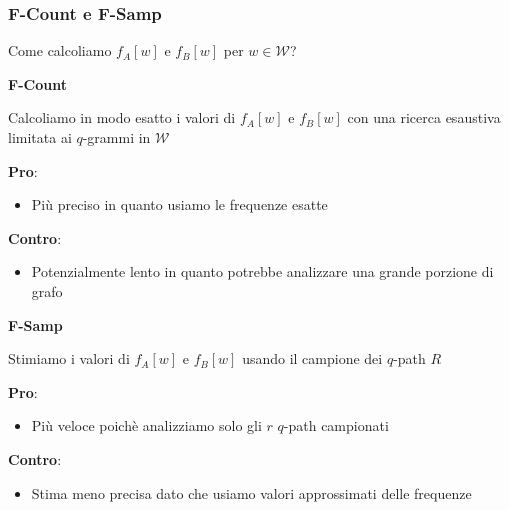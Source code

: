 \begin{frame}
	\frametitle{F-Count e F-Samp}
	\centering
	
	Come calcoliamo $f_A[w]$ e $f_B[w]$ per $w \in \mathcal{W}$?\medskip
	
	\pause
	
	\begin{minipage}{.45\textwidth}
		\centering
		\textbf{F-Count}
		
		Calcoliamo in modo esatto i valori di $f_A[w]$ e $f_B[w]$
		con una ricerca esaustiva limitata ai $q$-grammi in $\mathcal{W}$
		
		\bigskip
		
		\small		
		\textbf{Pro}:
		\begin{itemize}
			\item Più preciso in quanto usiamo le frequenze esatte
		\end{itemize}
		
		\textbf{Contro}:
		\begin{itemize}
			\item Potenzialmente lento in quanto potrebbe analizzare una grande porzione di grafo
		\end{itemize}
		
		\hfill
	\end{minipage}\hfill
	\pause
	\begin{minipage}{.45\textwidth}
		\centering
		\textbf{F-Samp}	
		
		 Stimiamo i valori di $f_A[w]$ e $f_B[w]$ 
		 usando il campione dei $q$-path $R$
		 
		 
		 \bigskip
		 
		 \small		
		 \textbf{Pro}:
		 \begin{itemize}
		 	\item Più veloce poichè analizziamo solo gli $r$ $q$-path campionati
		 \end{itemize}
		 
		 \textbf{Contro}:
		 \begin{itemize}
		 	\item Stima meno precisa dato che usiamo valori approssimati delle frequenze
		 \end{itemize}
		 
		\hfill
	\end{minipage}\hfill
	
\end{frame}

